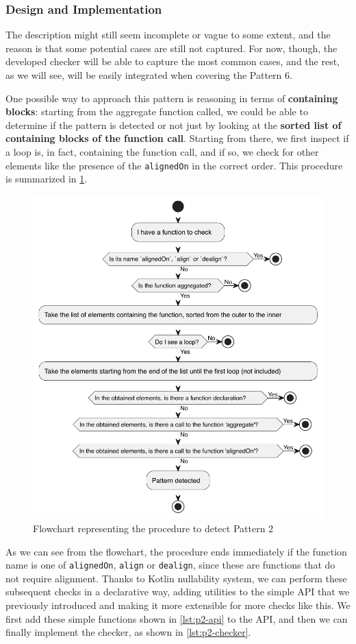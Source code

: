 \documentclass[12pt,a4paper,openright,twoside]{book}
\begin{document}
\subsubsection{Design and Implementation}

The description might still seem incomplete or vague to some extent, and the
reason is that some potential cases are still not captured. For now, though, the
developed checker will be able to capture the most common cases, and the rest,
as we will see, will be easily integrated when covering the Pattern 6. 

One possible way to approach this pattern is reasoning in terms of
\textbf{containing blocks}: starting from the aggregate function called, we
could be able to determine if the pattern is detected or not just by looking at
the \textbf{sorted list of containing blocks of the function call}. Starting
from there, we first inspect if a loop is, in fact, containing the function
call, and if so, we check for other elements like the presence of the
\lstinline{alignedOn} in the correct order. This procedure is summarized in
\cref{fig:p2-flowchart}.

\begin{figure}
  \centering
  \includegraphics[width=.6\linewidth]{figures/p2-flowchart.pdf}
  \caption{Flowchart representing the procedure to detect Pattern 2}
  \label{fig:p2-flowchart}
\end{figure}

As we can see from the flowchart, the procedure ends immediately if the function
name is one of \lstinline{alignedOn}, \lstinline{align} or \lstinline{dealign},
since these are functions that do not require alignment. Thanks to Kotlin 
nullability system, we can perform these subsequent checks in a declarative way,
adding utilities to the simple API that we previously introduced and making it 
more extensible for more checks like this.
%
We first add these simple functions shown in \cref{lst:p2-api} to the API, and
then we can finally implement the checker, as shown in \cref{lst:p2-checker}. 
\end{document}
